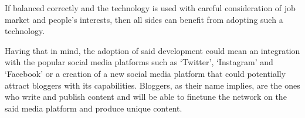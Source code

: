 \documentclass[12pt]{report}
\begin{document}
If balanced correctly and the technology is used with careful consideration of job market and people's interests, then
all sides can benefit from adopting such a technology.

Having that in mind, the adoption of said development could mean an integration with the popular social media platforms such as `Twitter',
`Instagram' and `Facebook' or a creation of a new social media platform that could potentially attract bloggers with its capabilities.
Bloggers, as their name implies, are the ones who write and publish content and will be able to finetune the network on the said media platform and produce
unique content.






{}

\end{document}
